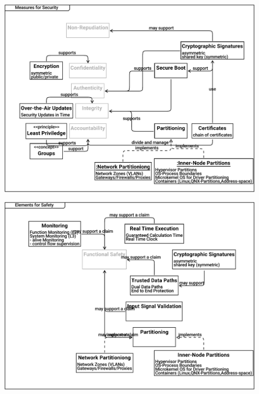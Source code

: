 \documentclass{article}
\begin{document}
\includegraphics[width= 1.0\linewidth]{quality_export/D0010_Measures_for_Security.pdf}


\includegraphics[width= 1.0\linewidth]{quality_export/D0011_Elements_for_Safety.pdf}

\end{document}
